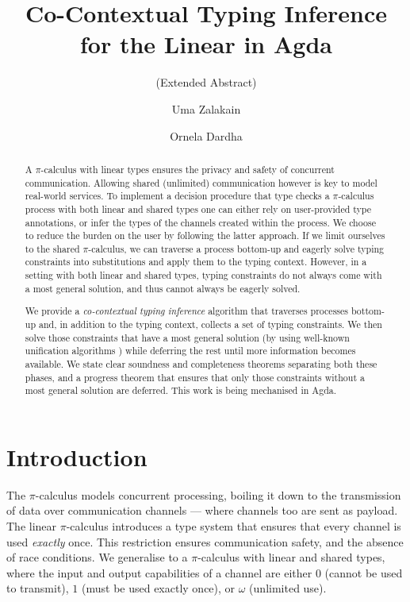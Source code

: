 \documentclass[sigplan,screen,review]{acmart}
\title
[Co-Contextual Typing Inference for the Linear \Picalc{} in Agda]
{Co-Contextual Typing Inference \\ for the Linear \Picalc{} in Agda}
\subtitle{(Extended Abstract)}
\author{Uma Zalakain}
\affiliation{University of Glasgow}
\author{Ornela Dardha}
\affiliation{University of Glasgow}
\theoremstyle{definition}\newtheorem{mytheorem}{Theorem}[section]
\newcommand{\picalc}{$\pi$-calculus}
\begin{document}
\begin{abstract}
  A \picalc{} with linear types ensures the privacy and safety of concurrent communication.
  Allowing shared (unlimited) communication however is key to model real-world services.
  To implement a decision procedure that type checks a \picalc{} process with both linear and shared types one can either rely on user-provided type annotations, or infer the types of the channels created within the process.
  We choose to reduce the burden on the user by following the latter approach.
  If we limit ourselves to the shared \picalc{}, we can traverse a process bottom-up and eagerly solve typing constraints into substitutions and apply them to the typing context.
  However, in a setting with both linear and shared types, typing constraints do not always come with a most general solution, and thus cannot always be eagerly solved.

  We provide a \emph{co-contextual typing inference} \cite{ErdwegBKKM15} algorithm that traverses processes bottom-up and, in addition to the typing context, collects a set of typing constraints.
  We then solve those constraints that have a most general solution (by using well-known unification algorithms \cite{McBride03}) while deferring the rest until more information becomes available.
  We state clear soundness and completeness theorems separating both these phases, and a progress theorem that ensures that only those constraints without a most general solution are deferred.
  This work is being mechanised in Agda.
\end{abstract}


\maketitle

\section{Introduction}\label{introduction}

The \picalc{} \cite{MilnerPW92a,Milner99} models concurrent processing, boiling it down to the transmission of data over communication channels --- where channels too are sent as payload.
The linear \picalc{} \cite{KobayashiPT96} introduces a type system that ensures that every channel is used \emph{exactly} once.
This restriction ensures communication safety, and the absence of race conditions.
We generalise to a \picalc{} with linear and shared types, where the input and output capabilities of a channel are either $0$ (cannot be used to transmit), $1$ (must be used exactly once), or $\omega$ (unlimited use).
\end{document}
